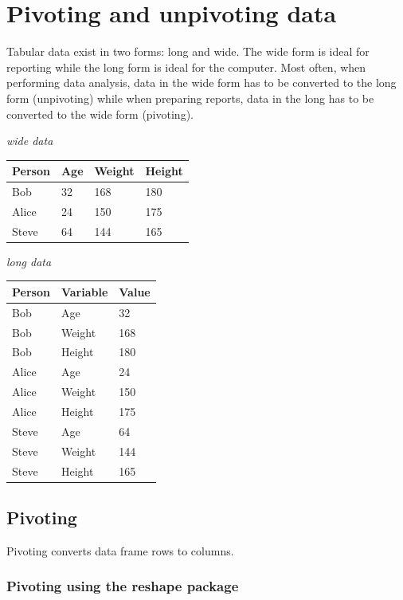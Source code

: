 \documentclass[
]{book}
\begin{document}
\hypertarget{br-reshape}{%
\section{Pivoting and unpivoting data}\label{br-reshape}}

Tabular data exist in two forms: long and wide. The wide form is ideal for reporting while the long form is ideal for the computer. Most often, when performing data analysis, data in the wide form has to be converted to the long form (unpivoting) while when preparing reports, data in the long has to be converted to the wide form (pivoting).

\emph{wide data}

\begin{longtable}[]{@{}llll@{}}
\toprule
Person & Age & Weight & Height \\
\midrule
\endhead
Bob & 32 & 168 & 180 \\
Alice & 24 & 150 & 175 \\
Steve & 64 & 144 & 165 \\
\bottomrule
\end{longtable}

\emph{long data}

\begin{longtable}[]{@{}lll@{}}
\toprule
Person & Variable & Value \\
\midrule
\endhead
Bob & Age & 32 \\
Bob & Weight & 168 \\
Bob & Height & 180 \\
Alice & Age & 24 \\
Alice & Weight & 150 \\
Alice & Height & 175 \\
Steve & Age & 64 \\
Steve & Weight & 144 \\
Steve & Height & 165 \\
\bottomrule
\end{longtable}

\hypertarget{pivoting}{%
\subsection{Pivoting}\label{pivoting}}

Pivoting converts data frame rows to columns.

\hypertarget{pivoting-using-the-reshape-package}{%
\subsubsection{\texorpdfstring{Pivoting using the \textbf{reshape} package}{Pivoting using the reshape package}}\label{pivoting-using-the-reshape-package}}
\end{document}
